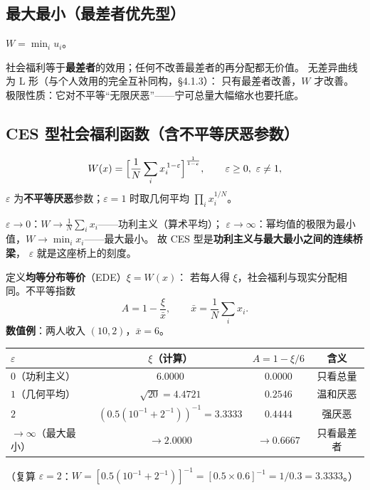 \subsection{最大最小（最差者优先型）}

$W=\min_i u_i$。

社会福利等于\textbf{最差者}的效用；任何不改善最差者的再分配都无价值。
无差异曲线为 L 形（与个人效用的完全互补同构，§4.1.3）：
只有最差者改善，$W$ 才改善。
极限性质：它对不平等“无限厌恶”——宁可总量大幅缩水也要托底。

\subsection{CES 型社会福利函数（含不平等厌恶参数）}

\[
W(x)=\Bigl[\frac1N\sum_i x_i^{\,1-\varepsilon}\Bigr]^{\frac{1}{1-\varepsilon}},
\qquad \varepsilon\ge0,\ \varepsilon\ne1,
\]
$\varepsilon$ 为\textbf{不平等厌恶}参数；$\varepsilon=1$ 时取几何平均
$\prod_i x_i^{1/N}$。

$\varepsilon\to0$：$W\to\frac1N\sum_i x_i$——功利主义（算术平均）；
$\varepsilon\to\infty$：幂均值的极限为最小值，$W\to\min_i x_i$——最大最小。
故 CES 型是\textbf{功利主义与最大最小之间的连续桥梁}，
$\varepsilon$ 就是这座桥上的刻度。

定义\textbf{均等分布等价}（EDE）$\xi=W(x)$：
若每人得 $\xi$，社会福利与现实分配相同。不平等指数
\[
A=1-\frac{\xi}{\bar x},\qquad \bar x=\frac1N\sum_ix_i.
\]
\textbf{数值例}：两人收入 $(10,2)$，$\bar x=6$。
\begin{center}
\small
\begin{tabular}{lccc}
\toprule
$\varepsilon$ & $\xi$（计算） & $A=1-\xi/6$ & 含义 \\
\midrule
$0$（功利主义） & $6.0000$ & $0.0000$ & 只看总量 \\
$1$（几何平均） & $\sqrt{20}=4.4721$ & $0.2546$ & 温和厌恶 \\
$2$ & $(0.5(10^{-1}+2^{-1}))^{-1}=3.3333$ & $0.4444$ & 强厌恶 \\
$\to\infty$（最大最小） & $\to2.0000$ & $\to0.6667$ & 只看最差者 \\
\bottomrule
\end{tabular}
\end{center}
（复算 $\varepsilon=2$：$W=[0.5(10^{-1}+2^{-1})]^{-1}=[0.5\times0.6]^{-1}=1/0.3=3.3333$。）

